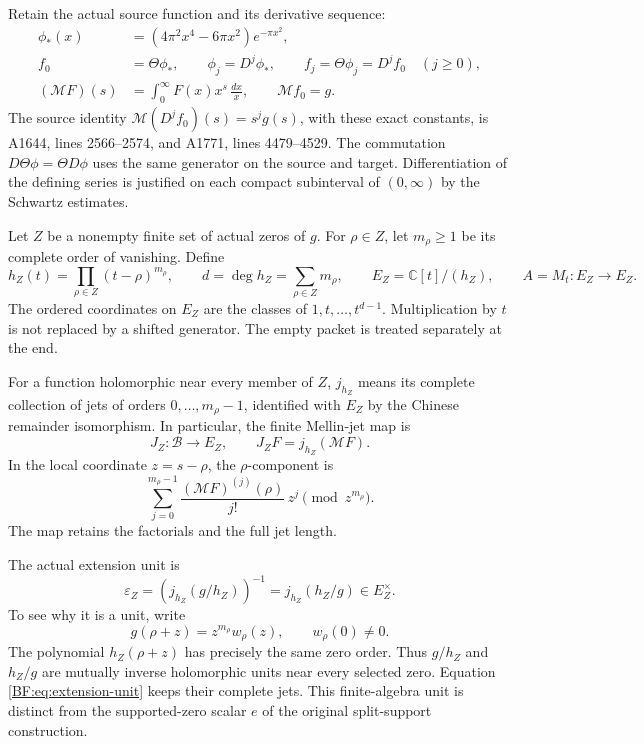 Retain the actual source function and its derivative sequence:
\begin{equation}
\begin{split}
\phi_*(x)&=(4\pi^2x^4-6\pi x^2)e^{-\pi x^2},\\
f_0&=\Theta\phi_*,
\qquad \phi_j=D^j\phi_*,
\qquad f_j=\Theta\phi_j=D^jf_0\quad(j\ge0),\\
(\mathcal MF)(s)&=\int_0^\infty F(x)x^s\,\frac{dx}{x},
\qquad \mathcal Mf_0=g.
\end{split}
\tag{BF.02}\label{BF:eq:theta-source}
\end{equation}
The source identity \(\mathcal M(D^jf_0)(s)=s^jg(s)\), with these exact
constants, is A1644, lines 2566--2574, and A1771, lines 4479--4529.
The commutation \(D\Theta\phi=\Theta D\phi\) uses the same generator on
the source and target.  Differentiation of the defining series is
justified on each compact subinterval of \((0,\infty)\) by the
Schwartz estimates.

Let \(Z\) be a nonempty finite set of actual zeros of \(g\).  For
\(\rho\in Z\), let \(m_\rho\ge1\) be its complete order of vanishing.
Define
\begin{equation}
h_Z(t)=\prod_{\rho\in Z}(t-\rho)^{m_\rho},\qquad
d=\deg h_Z=\sum_{\rho\in Z}m_\rho,\qquad
E_Z=\mathbb C[t]/(h_Z),\qquad
A=M_t:E_Z\longrightarrow E_Z.
\tag{BF.03}\label{BF:eq:packet}
\end{equation}
The ordered coordinates on \(E_Z\) are the classes of
\(1,t,\ldots,t^{d-1}\).  Multiplication by \(t\) is not replaced by a
shifted generator.  The empty packet is treated separately at the end.

For a function holomorphic near every member of \(Z\), \(j_{h_Z}\)
means its complete collection of jets of orders \(0,\ldots,m_\rho-1\),
identified with \(E_Z\) by the Chinese remainder isomorphism.
In particular, the finite Mellin-jet map is
\[
J_Z:\mathcal B\longrightarrow E_Z,\qquad
J_ZF=j_{h_Z}(\mathcal MF).
\]
In the local coordinate \(z=s-\rho\), the \(\rho\)-component is
\[
\sum_{j=0}^{m_\rho-1}
\frac{(\mathcal MF)^{(j)}(\rho)}{j!}\,z^j
       \pmod{z^{m_\rho}}.
\]
The map retains the factorials and the full jet length.

The actual extension unit is
\begin{equation}
\varepsilon_Z
 =\left(j_{h_Z}(g/h_Z)\right)^{-1}
 =j_{h_Z}(h_Z/g)\in E_Z^\times.
\tag{BF.04}\label{BF:eq:extension-unit}
\end{equation}
To see why it is a unit, write
\[
g(\rho+z)=z^{m_\rho}w_\rho(z),\qquad w_\rho(0)\ne0.
\]
The polynomial \(h_Z(\rho+z)\) has precisely the same zero order.
Thus \(g/h_Z\) and \(h_Z/g\) are mutually inverse holomorphic units
near every selected zero.  Equation \eqref{BF:eq:extension-unit}
keeps their complete jets.  This finite-algebra unit is distinct from
the supported-zero scalar \(e\) of the original split-support
construction.

